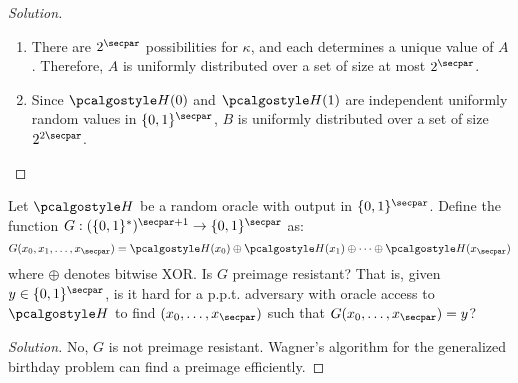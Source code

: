 \begin{proof}[Solution]
  \begin{enumerate}
    \item There are $2^\secpar$ possibilities for $\kappa$, and each determines a unique value of $A$. Therefore, $A$ is uniformly distributed over a set of size at most $2^\secpar$.
    \item Since $\algo{H}(0)$ and $\algo{H}(1)$ are independent uniformly random values in $\{0,1\}^\secpar$, $B$ is uniformly distributed over a set of size $2^{2\secpar}$.
  \end{enumerate}
\end{proof}

\begin{exercise}[Optional]
  Let $\algo{H}$ be a random oracle with output in $\{0,1\}^\secpar$. Define the function $G: (\{0,1\}^*)^{\secpar+1} \rightarrow \{0,1\}^\secpar$ as:
  \[
  G(x_0, x_1, \ldots, x_\secpar) = \algo{H}(x_0) \oplus \algo{H}(x_1) \oplus \cdots \oplus \algo{H}(x_\secpar)
  \]
  where $\oplus$ denotes bitwise XOR. Is $G$ preimage resistant? That is, given $y \in \{0,1\}^\secpar$, is it hard for a p.p.t. adversary with oracle access to $\algo{H}$ to find $(x_0, \ldots, x_\secpar)$ such that $G(x_0, \ldots, x_\secpar) = y$?
\end{exercise}

\begin{proof}[Solution]
  No, $G$ is not preimage resistant. Wagner's algorithm for the generalized birthday problem can find a preimage efficiently.
\end{proof}

